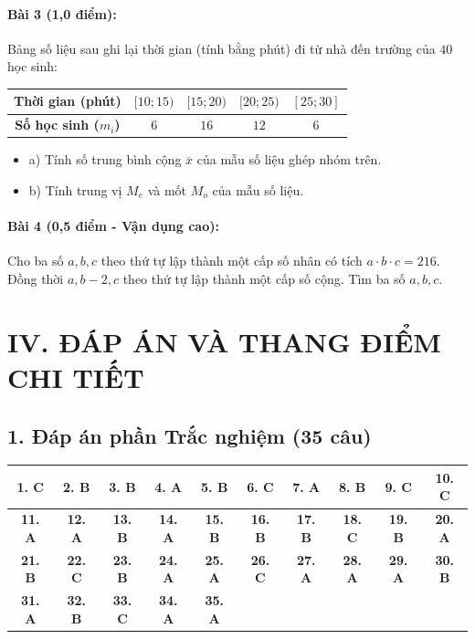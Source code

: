 \documentclass[12pt, a4paper]{article}
\begin{document}
\paragraph{Bài 3 (1,0 điểm):}
Bảng số liệu sau ghi lại thời gian (tính bằng phút) đi từ nhà đến trường của $40$ học sinh:
\begin{center}
\begin{tabular}{|c|c|c|c|c|}
\hline
\textbf{Thời gian (phút)} & $[10; 15)$ & $[15; 20)$ & $[20; 25)$ & $[25; 30]$ \\
\hline
\textbf{Số học sinh ($m_i$)} & $6$ & $16$ & $12$ & $6$ \\
\hline
\end{tabular}
\end{center}
\begin{itemize}
    \item a) Tính số trung bình cộng $\overline{x}$ của mẫu số liệu ghép nhóm trên.
    \item b) Tính trung vị $M_e$ và mốt $M_o$ của mẫu số liệu.
\end{itemize}

\paragraph{Bài 4 (0,5 điểm - Vận dụng cao):}
Cho ba số $a, b, c$ theo thứ tự lập thành một cấp số nhân có tích $a \cdot b \cdot c = 216$. Đồng thời $a, b - 2, c$ theo thứ tự lập thành một cấp số cộng. Tìm ba số $a, b, c$.

\newpage

\section*{IV. ĐÁP ÁN VÀ THANG ĐIỂM CHI TIẾT}

\subsection*{1. Đáp án phần Trắc nghiệm (35 câu)}
\begin{center}
\begin{tabular}{|c|c|c|c|c|c|c|c|c|c|}
\hline
\textbf{1. C} & \textbf{2. B} & \textbf{3. B} & \textbf{4. A} & \textbf{5. B} & \textbf{6. C} & \textbf{7. A} & \textbf{8. B} & \textbf{9. C} & \textbf{10. C} \\
\hline
\textbf{11. A} & \textbf{12. A} & \textbf{13. B} & \textbf{14. A} & \textbf{15. B} & \textbf{16. B} & \textbf{17. B} & \textbf{18. C} & \textbf{19. B} & \textbf{20. A} \\
\hline
\textbf{21. B} & \textbf{22. C} & \textbf{23. B} & \textbf{24. A} & \textbf{25. A} & \textbf{26. C} & \textbf{27. A} & \textbf{28. A} & \textbf{29. A} & \textbf{30. B} \\
\hline
\textbf{31. A} & \textbf{32. B} & \textbf{33. C} & \textbf{34. A} & \textbf{35. A} & & & & & \\
\hline
\end{tabular}
\end{center}
\end{document}
